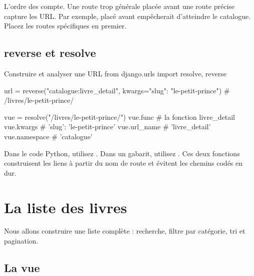 \begin{attention}
L'ordre des  compte. Une route trop générale placée avant une route
précise capture les URL. Par exemple,  placé avant
 empêcherait d'atteindre le catalogue. Placez les routes
spécifiques en premier.
\end{attention}

\subsection{reverse et resolve}

\begin{codebox}[python]{Construire et analyser une URL}
from django.urls import resolve, reverse

url = reverse("catalogue:livre_detail", kwargs={"slug": "le-petit-prince"})
# /livres/le-petit-prince/

vue = resolve("/livres/le-petit-prince/")
vue.func          # la fonction livre_detail
vue.kwargs        # {'slug': 'le-petit-prince'}
vue.url_name      # 'livre_detail'
vue.namespace     # 'catalogue'
\end{codebox}

\begin{bonne}
Dans le code Python, utilisez . Dans un gabarit, utilisez
. Ces deux fonctions construisent les liens à partir du nom
de route et évitent les chemins codés en dur.
\end{bonne}

\section{La liste des livres}

Nous allons construire une liste complète : recherche, filtre par catégorie, tri et
pagination.

\subsection{La vue}

